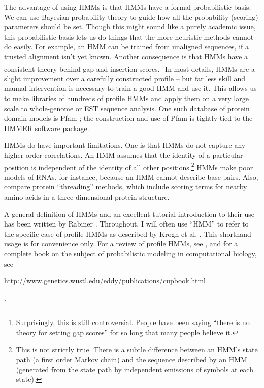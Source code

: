 \documentclass[11pt]{report}
\begin{document}
The advantage of using HMMs is that HMMs have a formal probabilistic
basis. We can use Bayesian probability theory to guide how all the
probability (scoring) parameters should be set. Though this might
sound like a purely academic issue, this probabilistic basis lets us
do things that the more heuristic methods cannot do easily. For
example, an HMM can be trained from unaligned sequences, if a trusted
alignment isn't yet known. Another consequence is that HMMs have a
consistent theory behind gap and insertion scores.\footnote{
Surprisingly, this is still controversial.  People have been saying
``there is no theory for setting gap scores'' for so long that many
people believe it.} In most details, HMMs are a slight improvement
over a carefully constructed profile -- but far less skill and manual
intervention is necessary to train a good HMM and use it.  This allows
us to make libraries of hundreds of profile HMMs and apply them on a
very large scale to whole-genome or EST sequence analysis.  One such
database of protein domain models is Pfam \cite{Sonnhammer97}; the
construction and use of Pfam is tightly tied to the HMMER software
package.

HMMs do have important limitations. One is that HMMs do not capture
any higher-order correlations.  An HMM assumes that the identity of a
particular position is independent of the identity of all other
positions.\footnote{This is not strictly true. There is a subtle
difference between an HMM's state path (a first order Markov chain)
and the sequence described by an HMM (generated from the state path by
independent emissions of symbols at each state).} HMMs make poor
models of RNAs, for instance, because an HMM cannot describe base
pairs. Also, compare protein ``threading'' methods, which include
scoring terms for nearby amino acids in a three-dimensional protein
structure. 

A general definition of HMMs and an excellent tutorial introduction to
their use has been written by Rabiner \cite{Rabiner89}. Throughout, I
will often use ``HMM'' to refer to the specific case of profile HMMs
as described by Krogh et al. \cite{Krogh94}. This shorthand usage is
for convenience only. For a review of profile HMMs, see \cite{Eddy96},
and for a complete book on the subject of probabilistic modeling in
computational biology, see \cite{Durbin98} 
\begin{htmlonly}
{http://www.genetics.wustl.edu/eddy/publications/cupbook.html}
\end{htmlonly}.
\end{document}
